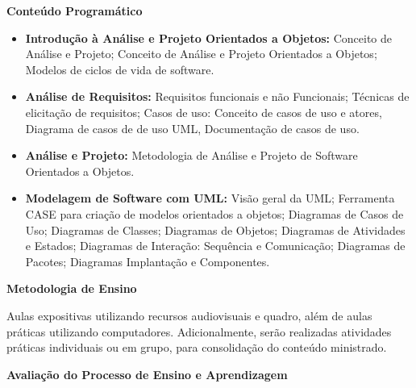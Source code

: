 
\begin{snugshade}\begin{center}\textbf{
    Conteúdo Programático
}\end{center}\end{snugshade}

\begin{itemize}

  \item \textbf{Introdução à Análise e Projeto Orientados a Objetos:} Conceito de Análise e Projeto; Conceito de Análise e Projeto Orientados a Objetos; Modelos de ciclos de vida de software.
 
  \item \textbf{Análise de Requisitos:} Requisitos funcionais e não Funcionais;	Técnicas de elicitação de requisitos; Casos de uso: Conceito de casos de uso e atores, Diagrama de casos de de uso UML, Documentação de casos de uso.
 
  \item \textbf{Análise e Projeto:} Metodologia de Análise e Projeto de Software Orientados a Objetos.
  
  \item \textbf{Modelagem de Software com UML:} Visão geral da UML; Ferramenta CASE para criação de modelos orientados a objetos; Diagramas de Casos de Uso; Diagramas de Classes; Diagramas de Objetos; Diagramas de Atividades e Estados;  Diagramas de Interação: Sequência e Comunicação; Diagramas de Pacotes; Diagramas Implantação e Componentes.

\end{itemize}


\begin{snugshade}\begin{center}\textbf{
    Metodologia de Ensino
}\end{center}\end{snugshade}

\noindent
   Aulas expositivas utilizando recursos audiovisuais e quadro, além de aulas práticas utilizando computadores. Adicionalmente, serão realizadas atividades práticas individuais ou em grupo, para consolidação do conteúdo ministrado.


\begin{snugshade}\begin{center}\textbf{
    Avaliação do Processo de Ensino e Aprendizagem
}\end{center}\end{snugshade}

